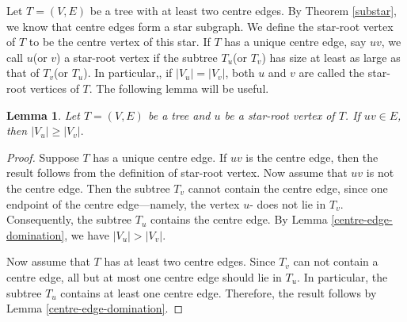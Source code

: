 \documentclass[12pt]{article}
\newtheorem{lemma}{Lemma}[section]
\begin{document}
Let $T=(V,E)$ be a tree with at least two centre edges. By Theorem \ref{substar}, we know that centre edges form a star subgraph. We define the  star-root vertex of $T$ to be the centre vertex of this star. If $T$ has a unique centre edge, say $uv$, we call $u$(or $v$) a star-root vertex if the subtree $T_u$(or $T_v$) has size at least as large as that of $T_v$(or $T_u$). In particular,, if $\vert V_u \vert =\vert V_v \vert$,  both $u$ and $v$ are called the star-root vertices of $T$. The following lemma will be useful.



\begin{lemma}\label{centre vertex domination}
    Let $T=(V,E)$ be a tree and $u$ be a star-root vertex of  $T$. If $uv \in E$, then $\vert V_u \vert \geq \vert V_v\vert.$
\end{lemma}
\begin{proof}
    Suppose $T$ has a unique centre edge. If $uv$ is the centre edge, then the result follows from the definition of star-root vertex. Now assume that $uv$ is not the centre edge. Then the subtree $T_v$ cannot contain the centre edge, since one endpoint of the centre edge—namely, the vertex $u$- does not lie in $T_v$. Consequently, the subtree $T_u$ contains the centre edge. By Lemma \ref{centre-edge-domination}, we have $\vert V_u \vert > \vert V_v \vert.$
    
    Now assume that $T$ has at least two centre edges. Since $T_v$ can not contain a centre edge, all but at most one centre edge should lie in $T_u$. In particular, the subtree $T_u$ contains at least one centre edge. Therefore, the result follows by Lemma \ref{centre-edge-domination}.
\end{proof}
\end{document}
